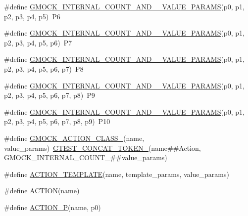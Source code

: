 \begin{DoxyCompactItemize}
\item 
\#define \mbox{\hyperlink{gmock-generated-actions_8h_ab79feaedfcef7df29e87695b82e9b65d}{G\+M\+O\+C\+K\+\_\+\+I\+N\+T\+E\+R\+N\+A\+L\+\_\+\+C\+O\+U\+N\+T\+\_\+\+A\+N\+D\+\_\+\_\+\+V\+A\+L\+U\+E\+\_\+\+P\+A\+R\+A\+MS}}(p0,  p1,  p2,  p3,  p4,  p5)~P6
\item 
\#define \mbox{\hyperlink{gmock-generated-actions_8h_ab4b49f0cdb482c0d7a6249607ac44f24}{G\+M\+O\+C\+K\+\_\+\+I\+N\+T\+E\+R\+N\+A\+L\+\_\+\+C\+O\+U\+N\+T\+\_\+\+A\+N\+D\+\_\+\_\+\+V\+A\+L\+U\+E\+\_\+\+P\+A\+R\+A\+MS}}(p0,  p1,  p2,  p3,  p4,  p5,  p6)~P7
\item 
\#define \mbox{\hyperlink{gmock-generated-actions_8h_a461b026c9cc310c199ab1f0b59111e5a}{G\+M\+O\+C\+K\+\_\+\+I\+N\+T\+E\+R\+N\+A\+L\+\_\+\+C\+O\+U\+N\+T\+\_\+\+A\+N\+D\+\_\+\_\+\+V\+A\+L\+U\+E\+\_\+\+P\+A\+R\+A\+MS}}(p0,  p1,  p2,  p3,  p4,  p5,  p6,  p7)~P8
\item 
\#define \mbox{\hyperlink{gmock-generated-actions_8h_a425b81bf1cdf7cd14d1e0184df9f204f}{G\+M\+O\+C\+K\+\_\+\+I\+N\+T\+E\+R\+N\+A\+L\+\_\+\+C\+O\+U\+N\+T\+\_\+\+A\+N\+D\+\_\+\_\+\+V\+A\+L\+U\+E\+\_\+\+P\+A\+R\+A\+MS}}(p0,  p1,  p2,  p3,  p4,  p5,  p6,  p7,  p8)~P9
\item 
\#define \mbox{\hyperlink{gmock-generated-actions_8h_abfe1adfe26341b5270a8d3385035c464}{G\+M\+O\+C\+K\+\_\+\+I\+N\+T\+E\+R\+N\+A\+L\+\_\+\+C\+O\+U\+N\+T\+\_\+\+A\+N\+D\+\_\+\_\+\+V\+A\+L\+U\+E\+\_\+\+P\+A\+R\+A\+MS}}(p0,  p1,  p2,  p3,  p4,  p5,  p6,  p7,  p8,  p9)~P10
\item 
\#define \mbox{\hyperlink{gmock-generated-actions_8h_af1442d2b3f80b5d04b409bca938fdcc5}{G\+M\+O\+C\+K\+\_\+\+A\+C\+T\+I\+O\+N\+\_\+\+C\+L\+A\+S\+S\+\_\+}}(name,  value\+\_\+params)~\mbox{\hyperlink{gtest-internal_8h_ae3c336cbe1ae2bd1b1d019333e4428a0}{G\+T\+E\+S\+T\+\_\+\+C\+O\+N\+C\+A\+T\+\_\+\+T\+O\+K\+E\+N\+\_\+}}(name\#\#Action, G\+M\+O\+C\+K\+\_\+\+I\+N\+T\+E\+R\+N\+A\+L\+\_\+\+C\+O\+U\+N\+T\+\_\+\#\#value\+\_\+params)
\item 
\#define \mbox{\hyperlink{gmock-generated-actions_8h_ad04fa741f313f0c23924d61fcfb1536d}{A\+C\+T\+I\+O\+N\+\_\+\+T\+E\+M\+P\+L\+A\+TE}}(name,  template\+\_\+params,  value\+\_\+params)
\item 
\#define \mbox{\hyperlink{gmock-generated-actions_8h_a7af7137aa4871df4235881af377205fe}{A\+C\+T\+I\+ON}}(name)
\item 
\#define \mbox{\hyperlink{gmock-generated-actions_8h_a8ee9766f611f068271ca37a90c0e5960}{A\+C\+T\+I\+O\+N\+\_\+P}}(name,  p0)
\item 

\end{DoxyCompactItemize}
